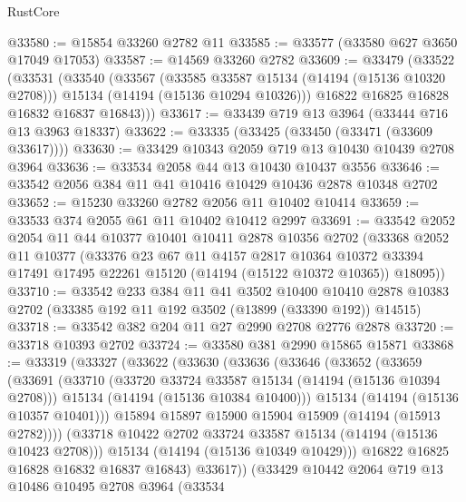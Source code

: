 \begin{lexlean}{RustCore}
\begin{coremodule}
@33580 := @15854 @33260 @2782 @11
@33585 := @33577 (@33580 @627 @3650 @17049 @17053)
@33587 := @14569 @33260 @2782
@33609 := @33479
    (@33522
      (@33531
        (@33540
          (@33567
            (@33585 @33587 @15134 (@14194 (@15136 @10320 @2708)))
            @15134
            (@14194 (@15136 @10294 @10326)))
          @16822
          @16825
          @16828
          @16832
          @16837
          @16843)))
@33617 := @33439 @719 @13 @3964 (@33444 @716 @13 @3963 @18337)
@33622 := @33335 (@33425 (@33450 (@33471 (@33609 @33617))))
@33630 := @33429 @10343 @2059 @719 @13 @10430 @10439 @2708 @3964
@33636 := @33534 @2058 @44 @13 @10430 @10437 @3556
@33646 := @33542 @2056 @384 @11 @41 @10416 @10429 @10436 @2878 @10348 @2702
@33652 := @15230 @33260 @2782 @2056 @11 @10402 @10414
@33659 := @33533 @374 @2055 @61 @11 @10402 @10412 @2997
@33691 := @33542
    @2052
    @2054
    @11
    @44
    @10377
    @10401
    @10411
    @2878
    @10356
    @2702
    (@33368
      @2052
      @11
      @10377
      (@33376
        @23
        @67
        @11
        @4157
        @2817
        @10364
        @10372
        @33394
        @17491
        @17495
        @22261
        @15120
        (@14194 (@15122 @10372 @10365))
        @18095))
@33710 := @33542
    @233
    @384
    @11
    @41
    @3502
    @10400
    @10410
    @2878
    @10383
    @2702
    (@33385 @192 @11 @192 @3502 (@13899 (@33390 @192)) @14515)
@33718 := @33542 @382 @204 @11 @27 @2990 @2708 @2776 @2878
@33720 := @33718 @10393 @2702
@33724 := @33580 @381 @2990 @15865 @15871
@33868 := @33319
    (@33327
      (@33622
        (@33630
          (@33636
            (@33646
              (@33652
                (@33659
                  (@33691
                    (@33710
                      (@33720 @33724 @33587 @15134 (@14194 (@15136 @10394 @2708)))
                      @15134
                      (@14194 (@15136 @10384 @10400)))
                    @15134
                    (@14194 (@15136 @10357 @10401)))
                  @15894
                  @15897
                  @15900
                  @15904
                  @15909
                  (@14194 (@15913 @2782))))
              (@33718 @10422 @2702 @33724 @33587 @15134 (@14194 (@15136 @10423 @2708)))
              @15134
              (@14194 (@15136 @10349 @10429)))
            @16822
            @16825
            @16828
            @16832
            @16837
            @16843)
          @33617))
      (@33429
        @10442
        @2064
        @719
        @13
        @10486
        @10495
        @2708
        @3964
        (@33534

\end{coremodule}
\end{lexlean}
